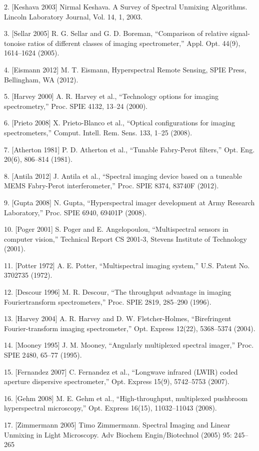 \documentclass{ctuthesis}
\begin{document}
2. [Keshava 2003] Nirmal Keshava. A Survey of Spectral Unmixing Algorithms. Lincoln Laboratory Journal, Vol. 14, 1, 2003.

3. [Sellar 2005] R. G. Sellar and G. D. Boreman, “Comparison of relative signal-tonoise
ratios of different classes of imaging spectrometer,” Appl. Opt. 44(9), 1614–1624 (2005).

4. [Eismann 2012] M. T. Eismann, Hyperspectral Remote Sensing, SPIE Press, Bellingham, WA (2012).

5. [Harvey 2000] A. R. Harvey et al., “Technology options for imaging spectrometry,”
Proc. SPIE 4132, 13–24 (2000).

6. [Prieto 2008] X. Prieto-Blanco et al., “Optical configurations for imaging spectrometers,” Comput. Intell. Rem. Sens. 133, 1–25 (2008).

7. [Atherton 1981] P. D. Atherton et al., “Tunable Fabry-Perot filters,” Opt. Eng. 20(6),
806–814 (1981).

8. [Antila 2012] J. Antila et al., “Spectral imaging device based on a tuneable MEMS
Fabry-Perot interferometer,” Proc. SPIE 8374, 83740F (2012).

9. [Gupta 2008] N. Gupta, “Hyperspectral imager development at Army Research
Laboratory,” Proc. SPIE 6940, 69401P (2008).

10. [Poger 2001] S. Poger and E. Angelopoulou, “Multispectral sensors in computer
vision,” Technical Report CS 2001-3, Stevens Institute of Technology (2001).

11. [Potter 1972] A. E. Potter, “Multispectral imaging system,” U.S. Patent No. 3702735 (1972).

12. [Descour 1996] M. R. Descour, “The throughput advantage in imaging Fouriertransform spectrometers,” Proc. SPIE 2819, 285–290 (1996).

13. [Harvey 2004] A. R. Harvey and D. W. Fletcher-Holmes, “Birefringent Fourier-transform imaging spectrometer,” Opt. Express 12(22), 5368–5374 (2004).

14. [Mooney 1995] J. M. Mooney, “Angularly multiplexed spectral imager,” Proc. SPIE
2480, 65–77 (1995).

15. [Fernandez 2007] C. Fernandez et al., “Longwave infrared (LWIR) coded aperture
dispersive spectrometer,” Opt. Express 15(9), 5742–5753 (2007).

16. [Gehm 2008] M. E. Gehm et al., “High-throughput, multiplexed pushbroom hyperspectral microscopy,” Opt. Express 16(15), 11032–11043 (2008).

17. [Zimmermann 2005] Timo Zimmermann. Spectral Imaging and Linear Unmixing in Light Microscopy. Adv Biochem Engin/Biotechnol (2005) 95: 245– 265
\end{document}
